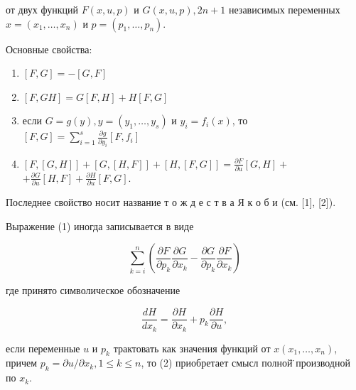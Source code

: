 \documentclass[10pt]{article}
\begin{document}
от двух функций $F(x, u, p)$ и $G(x, u, p), 2 n+1$ независимых переменных $x=\left(x_{1}, \ldots, x_{n}\right)$ и $p=\left(p_{1}, \ldots, p_{n}\right)$.



Основные свойства:



\begin{enumerate}

  \item $[F, G]=-[G, F]$



  \item $[F, G H]=G[F, H]+H[F, G]$



  \item если $G=g(y), y=\left(y_{1}, \ldots, y_{s}\right)$ и $y_{i}=f_{i}(x)$, то $[F, G]=\sum_{i=1}^{s} \frac{\partial g}{\partial y_{i}}\left[F, f_{i}\right]$



  \item $[F,[G, H]]+[G,[H, F]]+[H,[F, G]]=\frac{\partial F}{\partial u}[G, H]+$ $+\frac{\partial G}{\partial u}[H, F]+\frac{\partial H}{\partial u}[F, G]$.



\end{enumerate}



Последнее свойство носит название т о ж д е с т в а Я к о б и (см. [1], [2]).



Выражение (1) иногда записывается в виде



\[

\sum_{k=i}^{n}\left(\frac{\partial F}{\partial p_{k}} \frac{\partial G}{\partial x_{k}}-\frac{\partial G}{\partial p_{k}} \frac{\partial F}{\partial x_{k}}\right)

\]



где принято символическое обозначение



\[

\frac{d H}{d x_{k}}=\frac{\partial H}{\partial x_{k}}+p_{k} \frac{\partial H}{\partial u},

\]



если переменные $u$ и $p_{k}$ трактовать как значения функций от $x\left(x_{1}, \ldots, x_{n}\right)$, причем $p_{k}=\partial u / \partial x_{k}, 1 \leqslant k \leqslant n$, то (2) приобретает смысл полной̈ производной по $x_{k}$.
\end{document}
